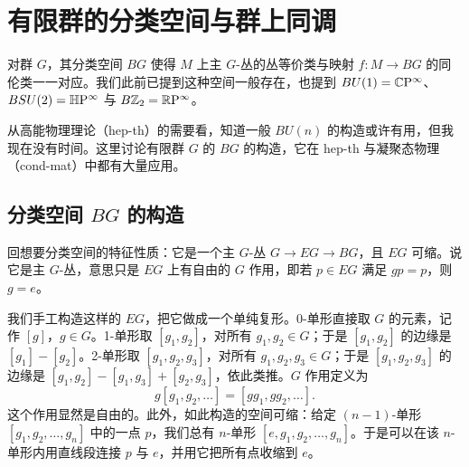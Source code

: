\chapter{有限群的分类空间与群上同调}

对群 $G$，其分类空间 $BG$ 使得 $M$ 上主 $G$-丛的丛等价类与映射 $f\colon M\to BG$ 的同伦类一一对应。我们此前已提到这种空间一般存在，也提到 $BU(1)=\mathbb{C}\mathrm{P}^\infty$、$BSU(2)=\mathbb{H}\mathrm{P}^\infty$ 与 $B\mathbb{Z}_2=\mathbb{R}\mathrm{P}^\infty$。

从高能物理理论（hep-th）的需要看，知道一般 $BU(n)$ 的构造或许有用，但我现在没有时间。这里讨论有限群 $G$ 的 $BG$ 的构造，它在 hep-th 与凝聚态物理（cond-mat）中都有大量应用。

\section{分类空间 $BG$ 的构造}

回想要分类空间的特征性质：它是一个主 $G$-丛 $G\to EG\to BG$，且 $EG$ 可缩。说它是主 $G$-丛，意思只是 $EG$ 上有自由的 $G$ 作用，即若 $p\in EG$ 满足 $gp=p$，则 $g=e$。

我们手工构造这样的 $EG$，把它做成一个单纯复形。0-单形直接取 $G$ 的元素，记作 $[g]$，$g\in G$。1-单形取 $[g_1,g_2]$，对所有 $g_1,g_2\in G$；于是 $[g_1,g_2]$ 的边缘是 $[g_1]-[g_2]$。2-单形取 $[g_1,g_2,g_3]$，对所有 $g_1,g_2,g_3\in G$；于是 $[g_1,g_2,g_3]$ 的边缘是 $[g_1,g_2]-[g_1,g_3]+[g_2,g_3]$，依此类推。$G$ 作用定义为
\begin{equation}
  g[g_1,g_2,\dots]=[gg_1,gg_2,\dots].
  \tag{9.1}
\end{equation}
这个作用显然是自由的。此外，如此构造的空间可缩：给定 $(n-1)$-单形 $[g_1,g_2,\dots,g_n]$ 中的一点 $p$，我们总有 $n$-单形 $[e,g_1,g_2,\dots,g_n]$。于是可以在该 $n$-单形内用直线段连接 $p$ 与 $e$，并用它把所有点收缩到 $e$。


